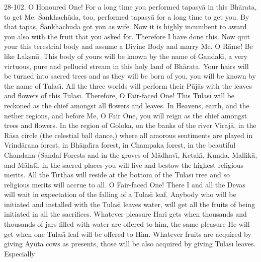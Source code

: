 28-102. O Honoured One! For a long time you performed tapasy\=a in this Bh\=arata, to get Me. \'Sankhach\=uda, too, performed tapasy\=a for a long time to get you. By that tapas, \'Sankhach\=uda got you as wife. Now it is highly incumbent to award you also with the fruit that you asked for. Therefore I have done this. Now quit your this terestrial body and assume a Divine Body and marry Me. O R\=ame! Be like Lak\d{s}m\={\i}. This body of yours will be known by the name of Gandak\={\i}, a very virtuous, pure and pellucid stream in this holy land of Bh\=arata. Your hairs will be turned into sacred trees and as they will be born of you, you will be known by the name of Tulas\={\i}. All the three worlds will perform their P\=uj\=as with the leaves and flowers of this Tulas\={\i}. Therefore, O Fair-faced One! This Tulas\={\i} will be reckoned as the chief amongst all flowers and leaves. In Heavens, earth, and the nether regions, and before Me, O Fair One, you will reign as the chief amongst trees and flowers. In the region of Goloka, on the banks of the river Viraj\=a, in the R\=asa circle (the celestial ball dance,) where all amorous sentiments are played in Vrind\=arana forest, in Bh\=a\d{n}d\={\i}ra forest, in Champaka forest, in the beautiful Chandana (Sandal Forests and in the groves of M\=adhav\={\i}, Ketak\={\i}, Kunda, Mallik\=a, and M\=alat\={\i}, in the sacred places you will live and bestow the highest religious merits. All the T\={\i}rthas will reside at the bottom of the Tulas\={\i} tree and so religious merits will accrue to all. O Fair-faced One! There I and all the Devas will wait in expectation of the falling of a Tulas\={\i} leaf. Anybody who will be initiated and installed with the Tulas\={\i} leaves water, will get all the fruits of being initiated in all the sacrifices. Whatever pleasure Hari gets when thousands and thousands of jars filled with water are offered to him, the same pleasure He will get when one Tulas\={\i} leaf will be offered to Him. Whatever fruits are acquired by giving Ayuta cows as presents, those will be also acquired by giving Tulas\={\i} leaves. Especially

